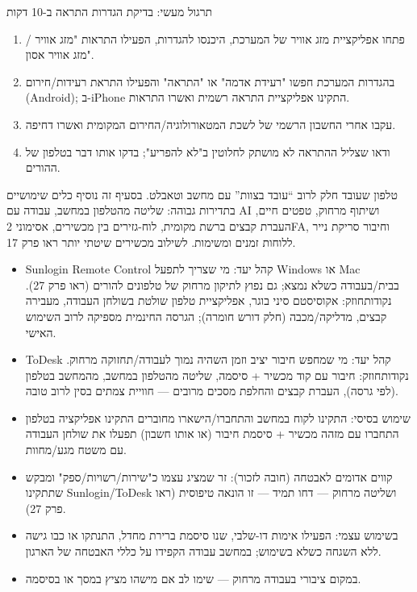 \begin{tcbpractice}{תרגול מעשי: בדיקת הגדרות התראה ב-10 דקות}
\begin{enumerate}
  \item פתחו אפליקציית מזג אוויר של המערכת, היכנסו להגדרות, הפעילו התראות "מזג אוויר / מזג אוויר אסון".
  \item בהגדרות המערכת חפשו "רעידת אדמה" או "התראה" והפעילו התראת רעידות/חירום (Android); ב-iPhone התקינו אפליקציית התראה רשמית ואשרו התראות.
  \item עקבו אחרי החשבון הרשמי של לשכת המטאורולוגיה/החירום המקומית ואשרו דחיפה.
  \item ודאו שצליל ההתראה לא מושתק לחלוטין ב"לא להפריע"; בדקו אותו דבר בטלפון של ההורים.
\end{enumerate}

\end{tcbpractice}


טלפון שעובד חלק לרוב “עובד בצוות” עם מחשב וטאבלט. בסעיף זה נוסיף כלים שימושיים בתדירות גבוהה: שליטה מהטלפון במחשב, עבודה עם AI ושיתוף מרחוק, טפטים חיים, העברת קבצים ברשת מקומית, לוח-גזירים בין מכשירים, אסימוני 2FA, וחיבור סריקת נייר ללוחות זמנים ומשימות. לשילוב מכשירים שיטתי יותר ראו פרק 17.


\begin{itemize}
  \item Sunlogin Remote Control קהל יעד: מי שצריך לתפעל Windows או Mac בבית/בעבודה כשלא נמצא; גם נפוץ לתיקון מרחוק של טלפונים להורים (ראו פרק 27). נקודותחוזק: אקוסיסטם סיני בוגר, אפליקציית טלפון שולטת בשולחן העבודה, מעבירה קבצים, מדליקה/מכבה (חלק דורש חומרה); הגרסה החינמית מספיקה לרוב השימוש האישי.
  \item ToDesk קהל יעד: מי שמחפש חיבור יציב וזמן השהיה נמוך לעבודה/תחזוקה מרחוק. נקודותחוזק: חיבור עם קוד מכשיר + סיסמה, שליטה מהטלפון במחשב, מהמחשב בטלפון (לפי גרסה), העברת קבצים והחלפת מסכים מרובים — חוויית צמתים בסין לרוב טובה.
  \item שימוש בסיסי: התקינו לקוח במחשב והתחברו/הישארו מחוברים התקינו אפליקציה בטלפון התחברו עם מזהה מכשיר + סיסמת חיבור (או אותו חשבון) תפעלו את שולחן העבודה עם משטח מגע/מחוות.
  \item קווים אדומים לאבטחה (חובה לזכור): זר שמציג עצמו כ"שירות/רשויות/ספק" ומבקש שתתקינו Sunlogin/ToDesk ושליטה מרחוק — דחו תמיד — זו הונאה טיפוסית (ראו פרק 27).
  \item בשימוש עצמי: הפעילו אימות דו-שלבי, שנו סיסמת ברירת מחדל, התנתקו או כבו גישה ללא השגחה כשלא בשימוש; במחשב עבודה הקפידו על כללי האבטחה של הארגון.
  \item במקום ציבורי בעבודה מרחוק — שימו לב אם מישהו מציץ במסך או בסיסמה.
\end{itemize}

